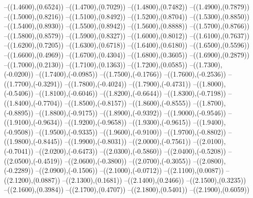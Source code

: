 {	--({\sx*(1.4600)},{\sy*(0.6524)})
	--({\sx*(1.4700)},{\sy*(0.7029)})
	--({\sx*(1.4800)},{\sy*(0.7482)})
	--({\sx*(1.4900)},{\sy*(0.7879)})
	--({\sx*(1.5000)},{\sy*(0.8216)})
	--({\sx*(1.5100)},{\sy*(0.8492)})
	--({\sx*(1.5200)},{\sy*(0.8704)})
	--({\sx*(1.5300)},{\sy*(0.8850)})
	--({\sx*(1.5400)},{\sy*(0.8930)})
	--({\sx*(1.5500)},{\sy*(0.8942)})
	--({\sx*(1.5600)},{\sy*(0.8888)})
	--({\sx*(1.5700)},{\sy*(0.8766)})
	--({\sx*(1.5800)},{\sy*(0.8579)})
	--({\sx*(1.5900)},{\sy*(0.8327)})
	--({\sx*(1.6000)},{\sy*(0.8012)})
	--({\sx*(1.6100)},{\sy*(0.7637)})
	--({\sx*(1.6200)},{\sy*(0.7205)})
	--({\sx*(1.6300)},{\sy*(0.6718)})
	--({\sx*(1.6400)},{\sy*(0.6180)})
	--({\sx*(1.6500)},{\sy*(0.5596)})
	--({\sx*(1.6600)},{\sy*(0.4969)})
	--({\sx*(1.6700)},{\sy*(0.4304)})
	--({\sx*(1.6800)},{\sy*(0.3605)})
	--({\sx*(1.6900)},{\sy*(0.2879)})
	--({\sx*(1.7000)},{\sy*(0.2130)})
	--({\sx*(1.7100)},{\sy*(0.1363)})
	--({\sx*(1.7200)},{\sy*(0.0585)})
	--({\sx*(1.7300)},{\sy*(-0.0200)})
	--({\sx*(1.7400)},{\sy*(-0.0985)})
	--({\sx*(1.7500)},{\sy*(-0.1766)})
	--({\sx*(1.7600)},{\sy*(-0.2536)})
	--({\sx*(1.7700)},{\sy*(-0.3291)})
	--({\sx*(1.7800)},{\sy*(-0.4024)})
	--({\sx*(1.7900)},{\sy*(-0.4731)})
	--({\sx*(1.8000)},{\sy*(-0.5406)})
	--({\sx*(1.8100)},{\sy*(-0.6046)})
	--({\sx*(1.8200)},{\sy*(-0.6644)})
	--({\sx*(1.8300)},{\sy*(-0.7198)})
	--({\sx*(1.8400)},{\sy*(-0.7704)})
	--({\sx*(1.8500)},{\sy*(-0.8157)})
	--({\sx*(1.8600)},{\sy*(-0.8555)})
	--({\sx*(1.8700)},{\sy*(-0.8895)})
	--({\sx*(1.8800)},{\sy*(-0.9175)})
	--({\sx*(1.8900)},{\sy*(-0.9392)})
	--({\sx*(1.9000)},{\sy*(-0.9546)})
	--({\sx*(1.9100)},{\sy*(-0.9634)})
	--({\sx*(1.9200)},{\sy*(-0.9658)})
	--({\sx*(1.9300)},{\sy*(-0.9615)})
	--({\sx*(1.9400)},{\sy*(-0.9508)})
	--({\sx*(1.9500)},{\sy*(-0.9335)})
	--({\sx*(1.9600)},{\sy*(-0.9100)})
	--({\sx*(1.9700)},{\sy*(-0.8802)})
	--({\sx*(1.9800)},{\sy*(-0.8445)})
	--({\sx*(1.9900)},{\sy*(-0.8031)})
	--({\sx*(2.0000)},{\sy*(-0.7561)})
	--({\sx*(2.0100)},{\sy*(-0.7041)})
	--({\sx*(2.0200)},{\sy*(-0.6473)})
	--({\sx*(2.0300)},{\sy*(-0.5860)})
	--({\sx*(2.0400)},{\sy*(-0.5208)})
	--({\sx*(2.0500)},{\sy*(-0.4519)})
	--({\sx*(2.0600)},{\sy*(-0.3800)})
	--({\sx*(2.0700)},{\sy*(-0.3055)})
	--({\sx*(2.0800)},{\sy*(-0.2289)})
	--({\sx*(2.0900)},{\sy*(-0.1506)})
	--({\sx*(2.1000)},{\sy*(-0.0712)})
	--({\sx*(2.1100)},{\sy*(0.0087)})
	--({\sx*(2.1200)},{\sy*(0.0887)})
	--({\sx*(2.1300)},{\sy*(0.1681)})
	--({\sx*(2.1400)},{\sy*(0.2466)})
	--({\sx*(2.1500)},{\sy*(0.3235)})
	--({\sx*(2.1600)},{\sy*(0.3984)})
	--({\sx*(2.1700)},{\sy*(0.4707)})
	--({\sx*(2.1800)},{\sy*(0.5401)})
	--({\sx*(2.1900)},{\sy*(0.6059)})
}
